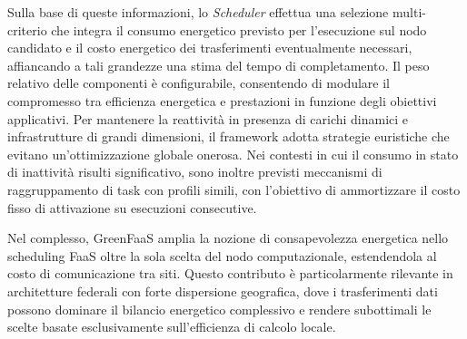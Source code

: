 Sulla base di queste informazioni, lo \emph{Scheduler} effettua una
selezione multi-criterio che integra il consumo energetico previsto per
l'esecuzione sul nodo candidato e il costo energetico dei trasferimenti
eventualmente necessari, affiancando a tali grandezze una stima del
tempo di completamento. Il peso relativo delle componenti è
configurabile, consentendo di modulare il compromesso tra efficienza
energetica e prestazioni in funzione degli obiettivi applicativi. Per
mantenere la reattività in presenza di carichi dinamici e
infrastrutture di grandi dimensioni, il framework adotta strategie
euristiche che evitano un'ottimizzazione globale onerosa. Nei contesti
in cui il consumo in stato di inattività risulti significativo, sono
inoltre previsti meccanismi di raggruppamento di task con profili simili,
con l'obiettivo di ammortizzare il costo fisso di attivazione su
esecuzioni consecutive.

Nel complesso, GreenFaaS amplia la nozione di consapevolezza energetica
nello scheduling FaaS oltre la sola scelta del nodo computazionale,
estendendola al costo di comunicazione tra siti. Questo contributo
è particolarmente rilevante in architetture federali con forte
dispersione geografica, dove i trasferimenti dati possono dominare il
bilancio energetico complessivo e rendere subottimali le scelte basate
esclusivamente sull'efficienza di calcolo locale.